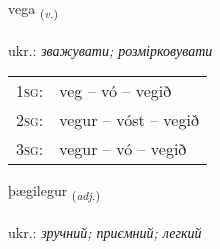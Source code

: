 \documentclass[frontgrid, backgrid]{flacards}\usepackage[]{graphicx}\usepackage[]{xcolor}
\begin{document}
\renewcommand{\flhead}{\vskip5pt \fboxsep=0pt {\small\bfseries\footnotesize Sagnorð | дієслово}}
\renewcommand{\fcfoot}{\vskip5pt \fboxsep=0pt \hspace{2pt}{\small\bfseries\footnotesize 2K}}

\renewcommand{\blhead}{\vskip5pt {\small\bfseries\footnotesize Sagnorð | дієслово }}
\renewcommand{\bcfoot}{\vskip5pt \hspace{2pt}{\small\bfseries\footnotesize 2K}}


{vega \small{\textsubscript{(\textit{v.})}} \\[1ex] %
\textphonetic{[vɛːɣa]} \\
ukr.: \emph{зважувати; розмірковувати} \\  [2ex]
\renewcommand*{\arraystretch}{0.8}
\begin{tabular}{p{1cm}l}
\textsc{1sg}: & veg -- vó -- vegið \\ 
\textsc{2sg}: & vegur -- vóst -- vegið \\ 
\textsc{3sg}: & vegur -- vó -- vegið \\ 
\end{tabular}
}

\renewcommand{\flhead}{\vskip5pt \fboxsep=0pt {\small\bfseries\footnotesize Lýsingarorð | прикметник}}
\renewcommand{\fcfoot}{\vskip5pt \fboxsep=0pt \hspace{2pt}{\small\bfseries\footnotesize 2K}}

\renewcommand{\blhead}{\vskip5pt {\small\bfseries\footnotesize Lýsingarorð | прикметник }}
\renewcommand{\bcfoot}{\vskip5pt \hspace{2pt}{\small\bfseries\footnotesize 2K}}


{þægilegur \small{\textsubscript{(\textit{adj.})}} \\[1ex] %
\textphonetic{[θaijɪlɛɣʏr]} \\
ukr.: \emph{зручний; приємний; легкий} \\  [2ex]
\renewcommand*{\arraystretch}{0.8}
}
\end{document}

